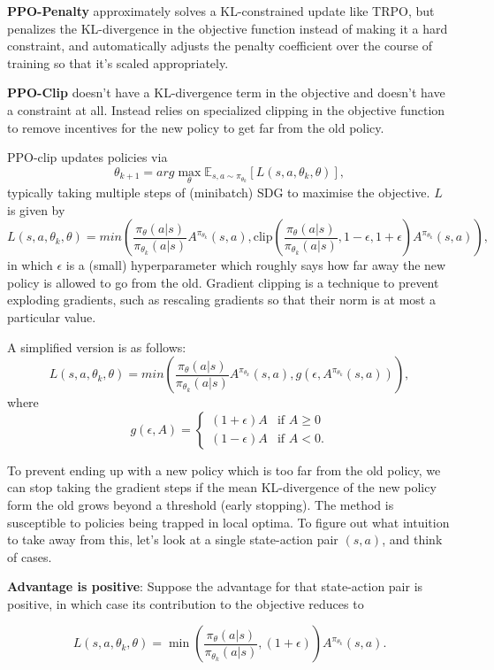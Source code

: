 \documentclass[12pt,a4paper]{article}
\begin{document}
\textbf{PPO-Penalty} approximately solves a KL-constrained update like TRPO, but penalizes the KL-divergence in the objective function instead of making it a hard constraint, and automatically adjusts the penalty coefficient over the course of training so that it’s scaled appropriately.

\textbf{PPO-Clip} doesn’t have a KL-divergence term in the objective and doesn’t have a constraint at all. Instead relies on specialized clipping in the objective function to remove incentives for the new policy to get far from the old policy.

PPO-clip updates policies via $$\theta_{k+1} = arg \max_\theta \mathbb{E}_{s,a \sim \pi_{\theta_k}} \left[ L(s,a,\theta_k,\theta) \right],$$ typically taking multiple steps of (minibatch) SDG to maximise the objective. $L$ is given by $$L(s,a,\theta_k,\theta) = min \left(\frac{\pi_\theta(a|s)}{\pi_{\theta_k}(a|s)} A^{\pi_{\theta_k}}(s,a), \text{clip} \left( \frac{\pi_\theta(a|s)}{\pi_{\theta_k}(a|s)}, 1 - \epsilon, 1 + \epsilon \right) A^{\pi_{\theta_k}}(s,a) \right),$$ in which $\epsilon$ is a (small) hyperparameter which roughly says how far away the new policy is allowed to go from the old. Gradient clipping is a technique to prevent exploding gradients, such as rescaling gradients so that their norm is at most a particular value. 

A simplified version is as follows: $$L(s,a,\theta_k,\theta) = min \left( \frac{\pi_\theta(a|s)}{\pi_{\theta_k}(a|s)} A^{\pi_{\theta_k}}(s,a), g(\epsilon, A^{\pi_{\theta_k}}(s,a)) \right),$$ where $$g(\epsilon, A) = \begin{cases} (1+\epsilon)A & \mbox{if } A \geq 0 \\ (1-\epsilon)A & \mbox{if } A < 0. \end{cases}$$

To prevent ending up with a new policy which is too far from the old policy, we can stop taking the gradient steps if the mean KL-divergence of the new policy form the old grows beyond a threshold (early stopping). The method is susceptible to policies being trapped in local optima. To figure out what intuition to take away from this, let's look at a
single state-action pair \((s,a)\), and think of cases.

\textbf{Advantage is positive}: Suppose the advantage for that
state-action pair is positive, in which case its contribution to the
objective reduces to

\[L(s,a,\theta_k,\theta) = \min\left(
\frac{\pi_{\theta}(a|s)}{\pi_{\theta_k}(a|s)}, (1 + \epsilon)
\right)  A^{\pi_{\theta_k}}(s,a).\]
\end{document}
